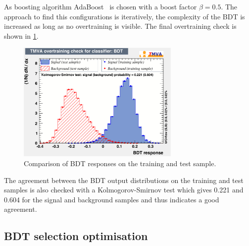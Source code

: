 As boosting algorithm AdaBoost~\cite{AdaBoost} is chosen with a boost factor $\beta=0.5$.
The approach to find this configurations is iteratively, \ie the complexity of the \ac{BDT} is increased as long as no overtraining is visible.
The final overtraining check is shown in \cref{fig:BDTOVertraining}.
\begin{figure}[tbp]
    \centering
    \includegraphics[width=0.7\textwidth]{06selection/figs/overtrain_BDT.pdf}
    \caption{Comparison of \ac{BDT} responses on the training and test sample.}
    \label{fig:BDTOVertraining}
\end{figure}
The agreement between the \ac{BDT} output distributions on the training and test samples is also checked with a Kolmogorov-Smirnov test which gives \num{0.221} and \num{0.604} for the signal and background samples and thus indicates a good agreement.

\subsection{BDT selection optimisation}
\label{sec:BDTOpt}

